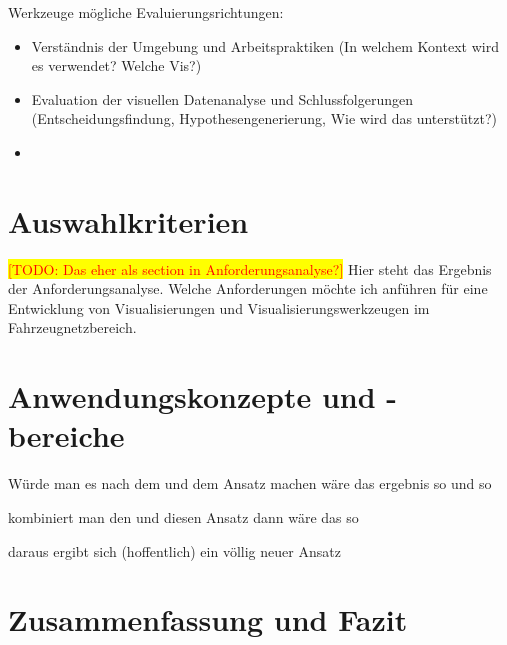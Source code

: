 \documentclass[draft=false
              ,paper=a4
              ,twoside=false
              ,fontsize=11pt
              ,headsepline
              ,BCOR10mm
              ,DIV11
              ]{scrbook}
\newcommand{\TODO}[1]{\colorbox{yellow}{\textcolor{red}{[TODO: #1]}}}
\begin{document}
Werkzeuge mögliche Evaluierungsrichtungen:

\begin{itemize}
  \item Verständnis der Umgebung und Arbeitspraktiken (In welchem Kontext wird es verwendet? Welche Vis?)
  \item Evaluation der visuellen Datenanalyse und Schlussfolgerungen (Entscheidungsfindung, Hypothesengenerierung, Wie wird das unterstützt?)
  \item 
\end{itemize}

\chapter{Auswahlkriterien} %
\label{cha:auswahlkriterien}
\TODO{Das eher als section in Anforderungsanalyse?}
Hier steht das Ergebnis der Anforderungsanalyse. Welche Anforderungen möchte ich anführen für eine Entwicklung von Visualisierungen und Visualisierungswerkzeugen im Fahrzeugnetzbereich.

\chapter{Anwendungskonzepte und -bereiche} %
\label{cha:anwendungskonzepte_und_bereiche}

Würde man es nach dem und dem Ansatz machen wäre das ergebnis so und so

kombiniert man den und diesen Ansatz dann wäre das so

daraus ergibt sich (hoffentlich) ein völlig neuer Ansatz

\chapter{Zusammenfassung und Fazit} %
\label{cha:zusammenfassung_und_fazit}


\backmatter




\renewcommand{\nomname}{Glossar}
\clearpage
\markboth{\nomname}{\nomname} %
\printnomenclature

\printindex

\HAWasurency
\end{document}
